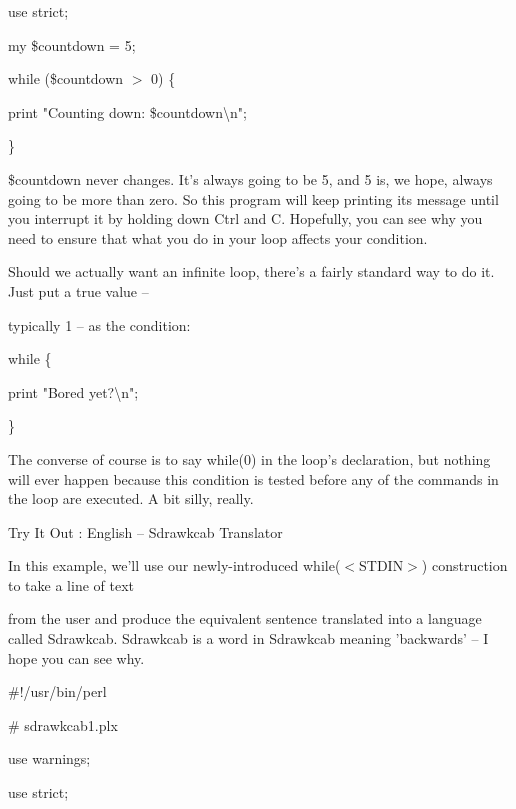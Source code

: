 \documentclass[a4paper,11pt]{book}
\begin{document}
\noindent use strict;

\noindent 

\noindent my \$countdown = 5;

\noindent 

\noindent while (\$countdown $>$ 0) \{

\noindent print "Counting down: \$countdown\textbackslash n";

\noindent \}

\noindent 

\noindent \$countdown never changes. It's always going to be 5, and 5 is, we hope, always going to be more than zero. So this program will keep printing its message until you interrupt it by holding down Ctrl and C. Hopefully, you can see why you need to ensure that what you do in your loop affects your condition.

\noindent 

\noindent Should we actually want an infinite loop, there's a fairly standard way to do it. Just put a true value --

\noindent typically 1 -- as the condition:

\noindent 

\noindent while \{

\noindent print "Bored yet?\textbackslash n";

\noindent \}

\noindent 

\noindent The converse of course is to say while(0) in the loop's declaration, but nothing will ever happen because this condition is tested before any of the commands in the loop are executed. A bit silly, really.

\noindent 

\noindent Try It Out : English -- Sdrawkcab Translator

\noindent 

\noindent In this example, we'll use our newly-introduced while($<$STDIN$>$) construction to take a line of text

\noindent from the user and produce the equivalent sentence translated into a language called Sdrawkcab. Sdrawkcab is a word in Sdrawkcab meaning 'backwards' -- I hope you can see why.

\noindent 

\noindent \#!/usr/bin/perl

\noindent \# sdrawkcab1.plx

\noindent use warnings;

\noindent use strict;
\end{document}
